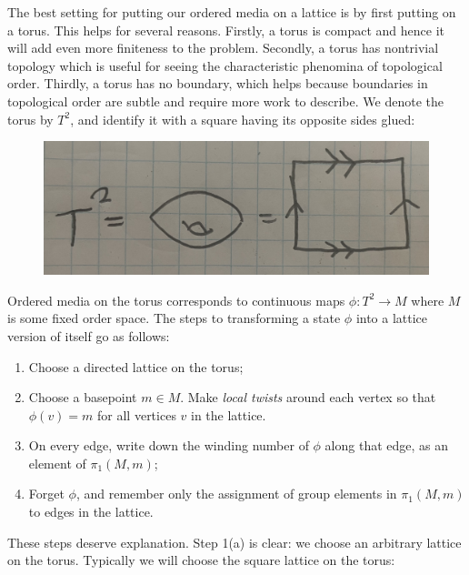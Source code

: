 \documentclass{article}
\theoremstyle{definition}
\numberwithin{figure}{section}
\begin{document}
The best setting for putting our ordered media on a lattice is by first putting on a torus. This helps for several reasons. Firstly, a torus is compact and hence it will add even more finiteness to the problem. Secondly, a torus has nontrivial topology which is useful for seeing the characteristic phenomina of topological order. Thirdly, a torus has no boundary, which helps because boundaries in topological order are subtle and require more work to describe. We denote the torus by $T^2$, and identify it with a square having its opposite sides glued:

\begin{figure}[h]
\begin{center}
\includegraphics[scale=.04]{torus-definition}
\end{center}
\end{figure}

Ordered media on the torus corresponds to continuous maps $\phi: T^2\to M$ where $M$ is some fixed order space. The steps to transforming a state $\phi$ into a lattice version of itself go as follows:

\begin{enumerate}
\item Choose a directed lattice on the torus;
\item Choose a basepoint $m\in M$. Make \textit{local twists} around each vertex so that $\phi(v)=m$ for all vertices $v$ in the lattice.
\item On every edge, write down the winding number of $\phi$ along that edge, as an element of $\pi_1(M,m)$;
\item Forget $\phi$, and remember only the assignment of group elements in $\pi_1(M,m)$ to edges in the lattice.
\end{enumerate}

These steps deserve explanation. Step 1(a) is clear: we choose an arbitrary lattice on the torus. Typically we will choose the square lattice on the torus:
\end{document}
